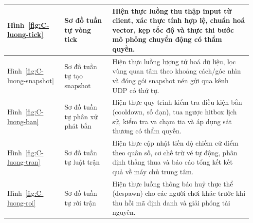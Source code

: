 \begin{center}
\begin{tabularx}{\linewidth}{|L{2.2cm}|L{4.2cm}|Y|}
Hình~\ref{fig:C-luong-tick} & Sơ đồ tuần tự vòng tick & Hiện thực luồng thu thập input từ client, xác thực tính hợp lệ, chuẩn hoá vector, kẹp tốc độ và thực thi bước mô phỏng chuyển động có thẩm quyền. \\ \hline
Hình~\ref{fig:C-luong-snapshot} & Sơ đồ tuần tự tạo snapshot & Hiện thực luồng lượng tử hoá dữ liệu, lọc vùng quan tâm theo khoảng cách/góc nhìn và đóng gói snapshot nén gửi qua kênh UDP có thứ tự. \\ \hline
Hình~\ref{fig:C-luong-ban} & Sơ đồ tuần tự phân xử phát bắn & Hiện thực quy trình kiểm tra điều kiện bắn (cooldown, số đạn), tua ngược hitbox lịch sử, kiểm tra va chạm tia và áp dụng sát thương có thẩm quyền. \\ \hline
Hình~\ref{fig:C-luong-tran} & Sơ đồ tuần tự luật trận & Hiện thực cập nhật tiến độ chiếm cứ điểm theo quân số, cơ chế trừ vé tự động, phân định thắng thua và báo cáo tổng kết kết quả về máy chủ trung tâm. \\ \hline
Hình~\ref{fig:C-luong-roi} & Sơ đồ tuần tự rời trận & Hiện thực luồng thông báo huỷ thực thể (despawn) cho các người chơi khác trước khi thu hồi mã định danh và giải phóng tài nguyên. \\ \hline
\end{tabularx}
\end{center}
